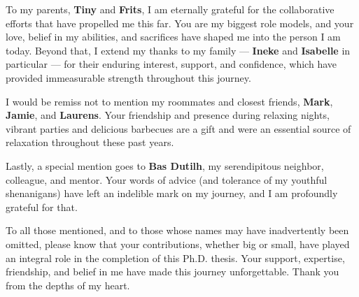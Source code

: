 To my parents, \textbf{Tiny} and \textbf{Frits}, I am eternally grateful for the collaborative efforts that have propelled me this far. You are my biggest role models, and your love, belief in my abilities, and sacrifices have shaped me into the person I am today. Beyond that, I extend my thanks to my family — \textbf{Ineke} and \textbf{Isabelle} in particular — for their enduring interest, support, and confidence, which have provided immeasurable strength throughout this journey.

I would be remiss not to mention my roommates and closest friends, \textbf{Mark}, \textbf{Jamie}, and \textbf{Laurens}. Your friendship and presence during relaxing nights, vibrant parties and delicious barbecues are a gift and were an essential source of relaxation throughout these past years.

Lastly, a special mention goes to \textbf{Bas Dutilh}, my serendipitous neighbor, colleague, and mentor. Your words of advice (and tolerance of my youthful shenanigans) have left an indelible mark on my journey, and I am profoundly grateful for that.

To all those mentioned, and to those whose names may have inadvertently been omitted, please know that your contributions, whether big or small, have played an integral role in the completion of this Ph.D. thesis. Your support, expertise, friendship, and belief in me have made this journey unforgettable. Thank you from the depths of my heart.

\stopthumb
\blankpage